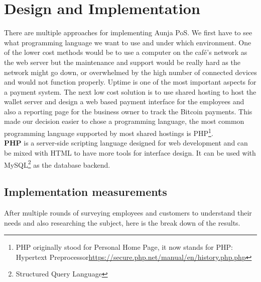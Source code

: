 \section{Design and Implementation}
\label{Design and Implementation}

There are multiple approaches for implementing Aunja PoS. We first have to see what programming language we want to use and under which environment. One of the lower cost methods would be to use a computer on the caf\'{e}'s network as the web server but the maintenance and support would be really hard as the network might go down, or overwhelmed by the high number of connected devices and would not function properly. Uptime is one of the most important aspects for a payment system. The next low cost solution is to use shared hosting to host the wallet server and design a web based payment interface for the employees and also a reporting page for the business owner to track the Bitcoin payments. This made our decision easier to chose a programming language, the most common programming language supported by most shared hostings is PHP\footnote{PHP originally stood for Personal Home Page, it now stands for PHP: Hypertext Preprocessor\url{https://secure.php.net/manual/en/history.php.php}}. 
\\ \textbf{PHP} is a server-side scripting language designed for web development and can be mixed with HTML to have more tools for interface design. It can be used with MySQL\footnote{Structured Query Language} as the database backend.

\subsection{Implementation measurements}
\label{Implementation measurements}
After multiple rounds of surveying employees and customers to understand their needs and also researching the subject, here is the break down of the results.

